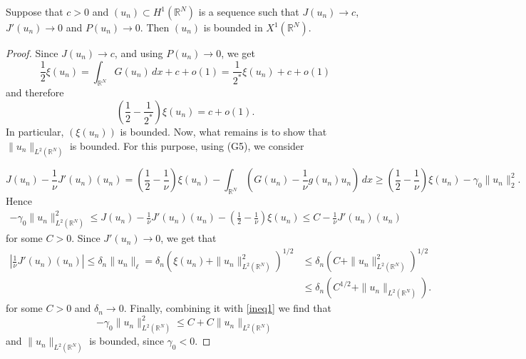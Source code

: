 \documentclass[10pt,a4paper]{amsart}
\newcommand{\R}{\mathbb{R}}
\begin{document}
\begin{Lem}\label{Lem:PPS-bounded}
Suppose that $c > 0$ and $(u_n) \subset H^1 (\R^N)$ is a sequence such that $J(u_n) \to c$, $J'(u_n) \to 0$ and $P(u_n) \to 0$. Then $(u_n)$ is bounded in $X^1 (\R^N)$.
\end{Lem}

\begin{proof}
Since $J(u_n) \to c$, and using $P(u_n) \to 0$, we get
$$
\frac12 \xi (u_n) =  \int_{\R^N} G(u_n) \, dx + c + o(1) = \frac{1}{2^*} \xi(u_n) + c + o(1)
$$
and therefore
$$
\left(\frac12 - \frac{1}{2^*}\right) \xi(u_n) = c + o(1). 
$$
In particular, $(\xi(u_n))$ is bounded. Now, what remains is to show that $\|u_n\|_{L^2 (\R^N)}$ is bounded. For this purpose, using (G5), we consider

$$
J(u_n) - \frac{1}{\nu} J'(u_n)(u_n) = \left( \frac{1}{2} - \frac{1}{\nu} \right) \xi(u_n) - \int_{\R^N} \left( G(u_n) - \frac{1}{\nu} g(u_n) u_n \right) \, dx \geq \left( \frac{1}{2} - \frac{1}{\nu} \right) \xi(u_n) - \gamma_0 \|u_n\|_2^2.
$$
Hence
\begin{align}\label{ineq1}
- \gamma_0 \|u_n\|_{L^2(\R^N)}^2 \leq J(u_n) - \frac{1}{\nu} J'(u_n)(u_n) - \left( \frac{1}{2} - \frac{1}{\nu} \right) \xi(u_n) \leq C - \frac{1}{\nu} J'(u_n)(u_n)
\end{align}
for some $C > 0$. Since $J'(u_n) \to 0$, we get that 
\begin{align*}
\left| \frac{1}{\nu} J'(u_n)(u_n) \right| \leq \delta_n \|u_n\|_\ell = \delta_n \left( \xi(u_n) + \|u_n\|_{L^2(\R^N)}^2 \right)^{1/2} &\leq \delta_n \left( C + \|u_n\|_{L^2(\R^N)}^2 \right)^{1/2} \\
&\leq \delta_n \left(C^{1/2} + \|u_n\|_{L^2(\R^N)}\right).
\end{align*}
for some $C>0$ and $\delta_n \to 0$. Finally, combining it with \eqref{ineq1} we find that
$$
-\gamma_0 \|u_n\|_{L^2(\R^N)}^2 \leq C + C \|u_n\|_{L^2 (\R^N)}
$$
and $\|u_n\|_{L^2(\R^N)}$ is bounded, since $\gamma_0 < 0$.
\end{proof}
\end{document}
